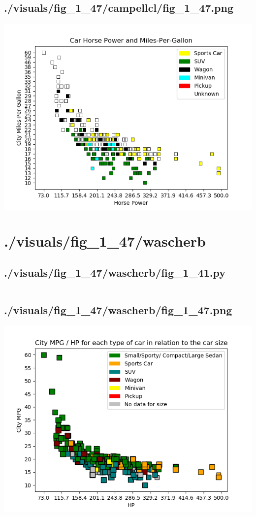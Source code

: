 \documentclass{article}
\begin{document}
    \subsection{./visuals/fig\_1\_47/campellcl/fig\_1\_47.png}
    \includegraphics[width=\textwidth]{.././visuals/fig_1_47/campellcl/fig_1_47.png}
    \pagebreak
    \section{./visuals/fig\_1\_47/wascherb}
    \subsection{./visuals/fig\_1\_47/wascherb/fig\_1\_41.py}
    \inputminted{python}{.././visuals/fig_1_47/wascherb/fig_1_41.py}
    \subsection{./visuals/fig\_1\_47/wascherb/fig\_1\_47.png}
    \includegraphics[width=\textwidth]{.././visuals/fig_1_47/wascherb/fig_1_47.png}
    \pagebreak
\end{document}
